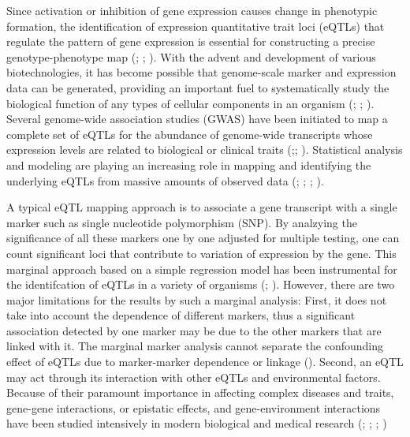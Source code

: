\documentclass[]{book}
\theoremstyle{definition}
\theoremstyle{definition}
\theoremstyle{remark}
\begin{document}
Since activation or inhibition of gene expression causes change in
phenotypic formation, the identification of expression quantitative
trait loci (eQTLs) that regulate the pattern of gene expression is
essential for constructing a precise genotype-phenotype map
(\cite{emilsson2008genetics}; \cite{cookson2009mapping};
\cite{nica2013expression}). With the advent and development of various
biotechnologies, it has become possible that genome-scale marker and
expression data can be generated, providing an important fuel to
systematically study the biological function of any types of cellular
components in an organism (\cite{kim2014meta}; \cite{fairfax2014innate};
\cite{lee2014common}). Several genome-wide association studies (GWAS)
have been initiated to map a complete set of eQTLs for the abundance of
genome-wide transcripts whose expression levels are related to
biological or clinical traits
(\cite{nica2013expression};\cite{li2013using};
\cite{koopmann2014genome}). Statistical analysis and modeling are
playing an increasing role in mapping and identifying the underlying
eQTLs from massive amounts of observed data
(\cite{kendziorski2006statistical}; \cite{chun2009expression};
\cite{sun2012statistical}; \cite{flutre2013statistical}).

A typical eQTL mapping approach is to associate a gene transcript with a
single marker such as single nucleotide polymorphism (SNP). By analzying
the significance of all these markers one by one adjusted for multiple
testing, one can count significant loci that contribute to variation of
expression by the gene. This marginal approach based on a simple
regression model has been instrumental for the identifcation of eQTLs in
a variety of organisms (\cite{rockman2010selection};
\cite{kim2014meta}). However, there are two major limitations for the
results by such a marginal analysis: First, it does not take into
account the dependence of different markers, thus a significant
association detected by one marker may be due to the other markers that
are linked with it. The marginal marker analysis cannot separate the
confounding effect of eQTLs due to marker-marker dependence or linkage
(\cite{wu2007statistical}). Second, an eQTL may act through its
interaction with other eQTLs and environmental factors. Because of their
paramount importance in affecting complex diseases and traits, gene-gene
interactions, or epistatic effects, and gene-environment interactions
have been studied intensively in modern biological and medical research
(\cite{cheverud1995epistasis}; \cite{moore2003ubiquitous};
\cite{van2010detection}; \cite{mackay2014epistasis})
\end{document}
